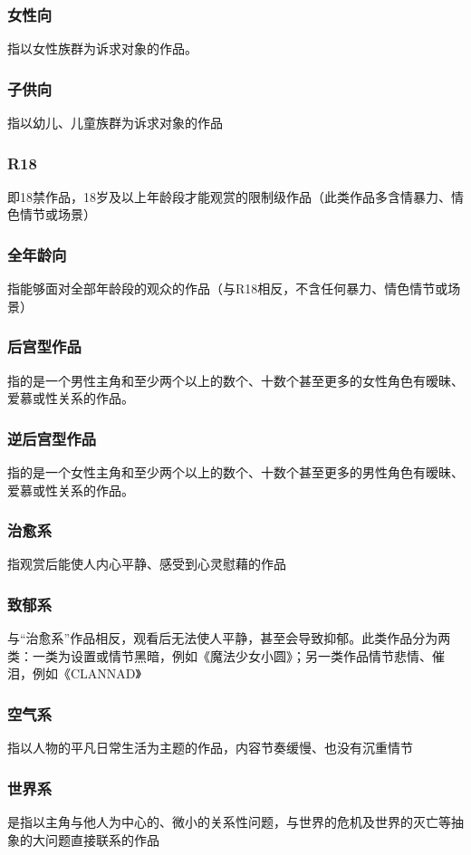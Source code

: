 \documentclass[UTF8,12pt]{ctexart}
\begin{document}
\subsubsection{女性向}指以女性族群为诉求对象的作品。
\subsubsection{子供向}指以幼儿、儿童族群为诉求对象的作品
\subsubsection{R18}即18禁作品，18岁及以上年龄段才能观赏的限制级作品（此类作品多含情暴力、情色情节或场景）
\subsubsection{全年龄向}指能够面对全部年龄段的观众的作品（与R18相反，不含任何暴力、情色情节或场景）
\subsubsection{后宫型作品}指的是一个男性主角和至少两个以上的数个、十数个甚至更多的女性角色有暧昧、爱慕或性关系的作品。
\subsubsection{逆后宫型作品}指的是一个女性主角和至少两个以上的数个、十数个甚至更多的男性角色有暧昧、爱慕或性关系的作品。
\subsubsection{治愈系}指观赏后能使人内心平静、感受到心灵慰藉的作品
\subsubsection{致郁系}与“治愈系”作品相反，观看后无法使人平静，甚至会导致抑郁。此类作品分为两类：一类为设置或情节黑暗，例如《魔法少女小圆》；另一类作品情节悲情、催泪，例如《CLANNAD》
\subsubsection{空气系}指以人物的平凡日常生活为主题的作品，内容节奏缓慢、也没有沉重情节
\subsubsection{世界系}是指以主角与他人为中心的、微小的关系性问题，与世界的危机及世界的灭亡等抽象的大问题直接联系的作品
\end{document}

